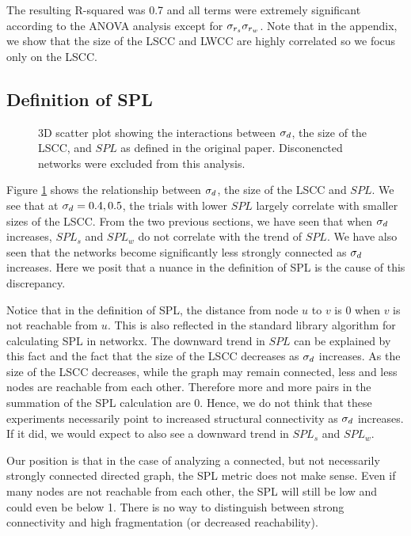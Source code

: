 The resulting R-squared was 0.7 and all terms were extremely significant
according to the ANOVA analysis except for $\sigma_{r_s}\sigma_{r_w}$.
Note that in the appendix, we show that the size of the LSCC and LWCC
are highly correlated so we focus only on the LSCC.

\subsection{Definition of SPL}
\begin{figure}[hbt!]\centering
    \par

    \caption{3D scatter plot showing the interactions between $\sigma_d$, the size
    of the LSCC, and $SPL$ as defined in the original paper. Disconencted networks
    were excluded from this analysis.}
    \label{fig:scSPL}
\end{figure}

Figure \ref{fig:scSPL} shows the relationship between $\sigma_d$, the size of the LSCC
and $SPL$. We see that at $\sigma_d= 0.4, 0.5$, the trials with lower $SPL$  largely
correlate with smaller sizes of the LSCC.
From the two previous sections, we have seen that when $\sigma_d$ increases,
$SPL_s$ and $SPL_w$ do not correlate with the trend of $SPL$.
We have also seen that the networks become significantly less
strongly connected as $\sigma_d$ increases.
Here we posit that a nuance in the definition of SPL is the cause of this
discrepancy.

Notice that in the definition of SPL, the distance from node $u$ to $v$ is 0 when
$v$ is not reachable from $u$.
This is also reflected in the standard library algorithm for calculating
SPL in networkx.
The downward trend in $SPL$ can be explained by this fact and the fact that
the size of the LSCC decreases as $\sigma_d$ increases.
As the size of the LSCC decreases, while the graph may remain connected,
less and less nodes are reachable from each other.
Therefore more and more pairs in the summation of the SPL calculation are 0.
Hence, we do not think that these experiments necessarily point to
increased structural connectivity as $\sigma_d$ increases.
If it did, we would expect to also see a downward trend in $SPL_s$ and $SPL_w$.

Our position is that in the case of analyzing a connected, but not necessarily
strongly connected directed graph, the SPL metric does not make sense.
Even if many nodes are not reachable from each other, the SPL will still be
low and could even be below 1.
There is no way to distinguish between strong connectivity and high
fragmentation (or decreased reachability).


